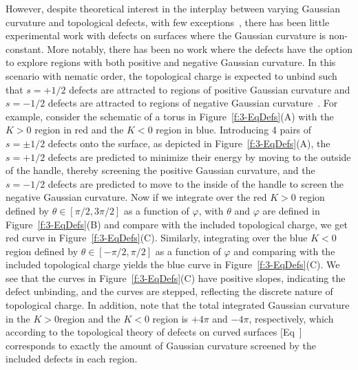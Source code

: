 However, despite theoretical interest in the interplay between varying Gaussian curvature and topological defects, with few exceptions~\cite{RN84,RN25,RN73,RN81}, there has been little experimental work with defects on surfaces where the Gaussian curvature is non-constant.
More notably, there has been no work where the defects have the option to explore regions with both positive and negative Gaussian curvature.
In this scenario with nematic order, the topological charge is expected to unbind such that $s = +1/2$ defects are attracted to regions of positive Gaussian curvature and $s=  -1/2$ defects are attracted to regions of negative Gaussian curvature~\cite{RN17,RN19,RN22}.
For example, consider the schematic of a torus in Figure~\ref{f:3-EqDefs}(A) with the $K>0$ region in red and the $K<0$ region in blue.
Introducing 4 pairs of $s = \pm 1/2$ defects onto the surface, as depicted in Figure~\ref{f:3-EqDefs}(A), the $s = +1/2$ defects are predicted to minimize their energy by moving to the outside of the handle, thereby screening the positive Gaussian curvature, and the $s = -1/2$ defects are predicted to move to the inside of the handle to screen the negative Gaussian curvature.
Now if we integrate over the red $K>0$ region defined by $\theta \in [\pi/2,3 \pi/2]$ as a function of $\varphi$, with $\theta$ and $\varphi$ are defined in Figure~\ref{f:3-EqDefs}(B) and compare with the included topological charge, we get red curve in Figure~\ref{f:3-EqDefs}(C).
Similarly, integrating over the blue $K<0$ region defined by $\theta \in [-\pi/2,\pi/2]$ as a function of $\varphi$ and comparing with the included topological charge yields the blue curve in Figure~\ref{f:3-EqDefs}(C).
We see that the curves in Figure~\ref{f:3-EqDefs}(C) have positive slopes, indicating the defect unbinding, and the curves are stepped, reflecting the discrete nature of topological charge.
In addition, note that the total integrated Gaussian curvature in the $K>0$region and the $K<0$ region is $+4 \pi$ and $-4\pi$, respectively, which according to the topological theory of defects on curved surfaces [Eq~] corresponds to exactly the amount of Gaussian curvature screened by the included defects in each region.

